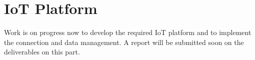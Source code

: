 \section{IoT Platform}
Work is on progress now to develop the required IoT platform and to implement the connection and data management. A report will be submitted soon on the deliverables on this part.

